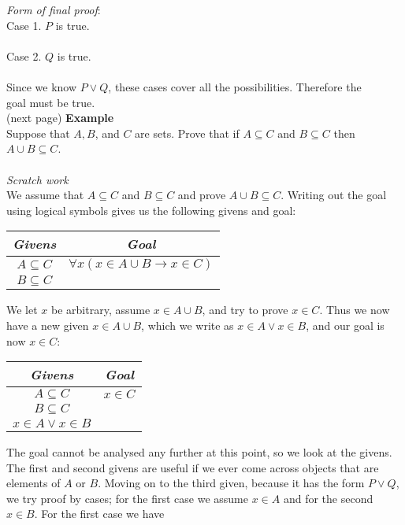 \documentclass{report}
\theoremstyle{definition}
\begin{document}
\textit{Form of final proof}:
\vspace{1mm}\\
\indent Case 1. $P$ is true.\\
\indent{}\\
\indent Case 2. $Q$ is true.\\
\indent{}\\
\indent Since we know $P\lor Q$, these cases cover all the possibilities. Therefore the\\
\indent goal must be true.\\
(next page)\newpage
\noindent\textbf{Example}\\
Suppose that $A,B$, and $C$ are sets. Prove that if $A\subseteq C$ and $B\subseteq C$ then $A\cup B\subseteq C$.\\
\vspace{1mm}\\
\textit{Scratch work}\\
We assume that $A\subseteq C$ and $B\subseteq C$ and prove $A\cup B\subseteq C$. Writing out the goal using logical symbols gives us the following givens and goal:
\begin{center}
\begin{tabular}{c|c}
\textit{Givens}&\textit{Goal}\\
\hline
$A\subseteq C$&$\forall x(x\in A\cup B\to x\in C)$\\
$B\subseteq C$&
\end{tabular}
\end{center}
We let $x$ be arbitrary, assume $x\in A\cup B$, and try to prove $x\in C$. Thus we now have a new given $x\in A\cup B$, which we write as $x\in A\lor x\in B$, and our goal is now $x\in C$:
\begin{center}
\begin{tabular}{c|c}
\textit{Givens}&\textit{Goal}\\
\hline
$A\subseteq C$&$x\in C$\\
$B\subseteq C$&\\
$x\in A\lor x\in B$&
\end{tabular}
\end{center}
The goal cannot be analysed any further at this point, so we look at the givens. The first and second givens are useful if we ever come across objects that are elements of $A$ or $B$. Moving on to
the third given, because it has the form $P\lor Q$, we try proof by cases; for the first case we assume $x\in A$ and for the second $x\in B$. For the first case we have
\end{document}
